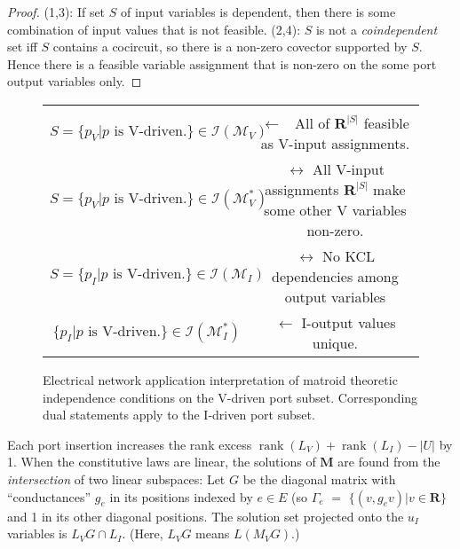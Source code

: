 \documentclass{amsproc-sunycstr}
\def\Reals{\ensuremath{\mathbf R}}
\theoremstyle{plain}
\theoremstyle{definition}
\theoremstyle{remark}
\DeclareMathOperator{\rank}{rank}
\begin{document}
\begin{proof}
(1,3):
If set $S$ of input variables is dependent, then there is
some combination of input values that is not feasible.
(2,4):
$S$ is not a \textit{coindependent} set iff $S$ contains a cocircuit, so
there is a non-zero covector supported by $S$.  Hence there is a 
feasible variable assignment that is non-zero on the some port output
variables only.
\end{proof}


\begin{figure}
\label{matroid-port-conditions}
\begin{tabular}{|c|c|} \hline \\
$S=\{p_V | p \mbox{\ is V-driven.}\} \in \mathcal{I}(\mathcal{M}_V)$& 
            \begin{minipage}{2.5in}
               $\leftarrow$ \ All of $\Reals^{|S|}$ feasible as V-input assignments.
            \end{minipage}
			\\  \hline  \hline
$S=\{p_V | p \mbox{\ is V-driven.}\} \in \mathcal{I}(\mathcal{M}_V^*)$& 
            \begin{minipage}{2.5in}
              $\leftrightarrow$
            All V-input assignments $\Reals^{|S|}$ make some other V variables non-zero.
            \end{minipage}
			\\  \hline  \hline
$S=\{p_I | p \mbox{\ is V-driven.}\}  \in \mathcal{I}(\mathcal{M}_I)$&
            \begin{minipage}{2.5in}
             $\leftrightarrow$
             No KCL dependencies among output variables
             \end{minipage}
			\\  \hline  \hline
$\{p_I | p \mbox{\ is V-driven.}\}  \in \mathcal{I}(\mathcal{M}_I^*)$ & 
            \begin{minipage}{2.5in}
            $\leftarrow$ I-output values unique.
	    \end{minipage}
			\\ \hline 
\end{tabular}
\caption{Electrical network application interpretation of matroid theoretic 
independence conditions on the V-driven port subset.  Corresponding dual 
statements
apply to the I-driven port subset.}
\end{figure}

Each port insertion increases the rank excess $\rank(L_V)+\rank(L_I)-|U|$ by 1.
When the constitutive laws are linear, the solutions of $\mathbf{M}$ are
found from the \textit{intersection} of two linear subspaces:  Let $G$ 
be the diagonal matrix with ``conductances'' $g_e$ in its positions
indexed by $e \in E$ (so $\Gamma_e$ $=$ $\{ (v, g_e v) | v \in \Reals \}$
and 1 in its other diagonal positions.  The solution set projected onto
the $u_I$ variables is $L_VG\cap L_I$.  
(Here, $L_V G$ means $L(M_V G)$.)
\end{document}
